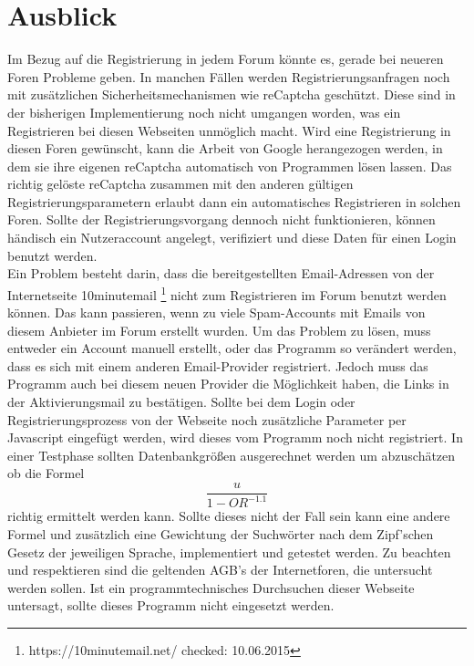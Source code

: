 \section{Ausblick}
Im Bezug auf die Registrierung in jedem Forum könnte es, gerade bei neueren Foren Probleme geben. In manchen Fällen werden Registrierungsanfragen noch mit zusätzlichen Sicherheitsmechanismen wie reCaptcha geschützt. Diese sind in der bisherigen Implementierung noch nicht umgangen worden, was ein Registrieren bei diesen Webseiten unmöglich macht. Wird eine Registrierung in diesen Foren gewünscht, kann die Arbeit von Google herangezogen werden, in dem sie ihre eigenen reCaptcha automatisch von Programmen lösen lassen. Das richtig gelöste reCaptcha zusammen mit den anderen gültigen Registrierungsparametern erlaubt dann ein automatisches Registrieren in solchen Foren. Sollte der Registrierungsvorgang dennoch nicht funktionieren, können händisch ein Nutzeraccount angelegt, verifiziert und diese Daten für einen Login benutzt werden.\\
Ein Problem besteht darin, dass die bereitgestellten Email-Adressen von der Internetseite 10minutemail \footnote{https://10minutemail.net/ checked: 10.06.2015} nicht zum Registrieren im Forum benutzt werden können. Das kann passieren, wenn zu viele Spam-Accounts mit Emails von diesem Anbieter im Forum erstellt wurden. Um das Problem zu lösen, muss entweder ein Account manuell erstellt, oder das Programm so verändert werden, dass es sich mit einem anderen Email-Provider registriert. Jedoch muss das Programm auch bei diesem neuen Provider die Möglichkeit haben, die Links in der Aktivierungsmail zu bestätigen.
Sollte bei dem Login oder Registrierungsprozess von der Webseite noch zusätzliche Parameter per Javascript eingefügt werden, wird dieses vom Programm noch nicht registriert.
In einer Testphase sollten Datenbankgrößen ausgerechnet werden um abzuschätzen ob die Formel  \[\frac{u}{1-OR^{-1.1}}\] \cite{lu2008efficient} richtig ermittelt werden kann. Sollte dieses nicht der Fall sein kann eine andere Formel und zusätzlich eine Gewichtung der Suchwörter nach dem Zipf'schen Gesetz \cite{leopold2002zipfsche} der jeweiligen Sprache, implementiert und getestet werden\cite{jiang2009selectivity}.
Zu beachten und respektieren sind die geltenden AGB's der Internetforen, die untersucht werden sollen. Ist ein programmtechnisches Durchsuchen dieser Webseite untersagt, sollte dieses Programm nicht eingesetzt werden.
